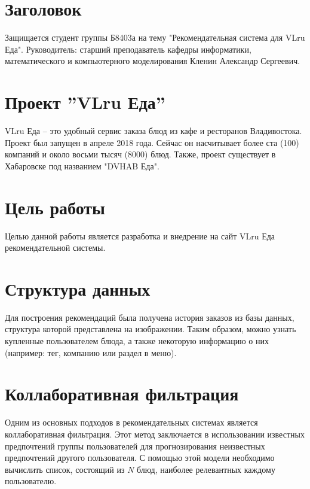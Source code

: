 \documentclass{fefu}
\begin{document}
  \section*{Заголовок}
  Защищается студент группы Б8403а на тему "Рекомендательная система для VLru Еда".
  Руководитель: старший преподаватель кафедры информатики, математического и компьютерного
  моделирования Кленин Александр Сергеевич.

  \section{Проект ”VLru Еда”}
  VLru Еда – это удобный сервис заказа блюд из кафе и ресторанов Владивостока.
  Проект был запущен в апреле 2018 года. Сейчас он насчитывает более ста (100) компаний
  и около восьми тысяч (8000) блюд. Также, проект существует в Хабаровске под
  названием "DVHAB Еда".

  \section{Цель работы}
  Целью данной работы является разработка и внедрение на сайт VLru Еда
  рекомендательной системы.

  \section{Структура данных}
  Для построения рекомендаций была получена история заказов из базы данных,
  структура которой представлена на изображении. Таким образом, можно узнать
  купленные пользователем блюда, а также некоторую информацию о них (например:
  тег, компанию или раздел в меню).

  \section{Коллаборативная фильтрация}
  Одним из основных подходов в рекомендательных системах является коллаборативная фильтрация.
  Этот метод заключается в использовании известных предпочтений группы
  пользователей для прогнозирования неизвестных предпочтений другого пользователя.
  С помощью этой модели необходимо вычислить список, состоящий из $N$ блюд, наиболее
  релевантных каждому пользователю.
\end{document}
